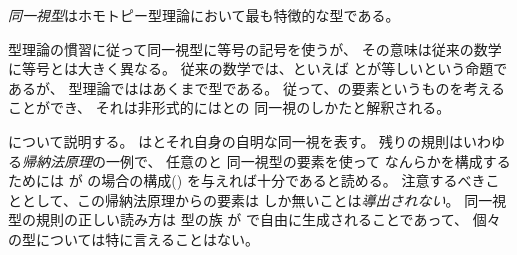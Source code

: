 \documentclass[index]{subfiles}
\begin{document}

\emph{同一視型}はホモトピー型理論において最も特徴的な型である。



型理論の慣習に従って同一視型に等号の記号を使うが、
その意味は従来の数学に等号とは大きく異なる。
従来の数学では、といえば
とが等しいという命題であるが、
型理論でははあくまで型である。
従って、の要素というものを考えることができ、
それは非形式的にはとの
同一視のしかたと解釈される。

について説明する。
はとそれ自身の自明な同一視を表す。
残りの規則はいわゆる\emph{帰納法原理}の一例で、
任意のと
同一視型の要素を使って
なんらかを構成するためには
が
の場合の構成()
を与えれば十分であると読める。
注意するべきこととして、この帰納法原理からの要素は
しか無いことは\emph{導出されない}。
同一視型の規則の正しい読み方は
型の族
が
で自由に生成されることであって、
個々の型については特に言えることはない。
\end{document}

